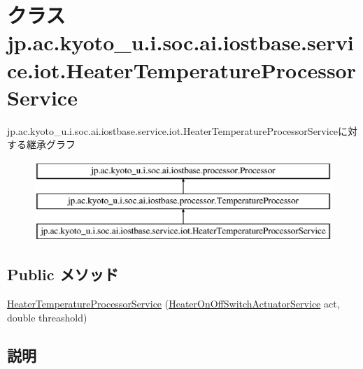 \hypertarget{classjp_1_1ac_1_1kyoto__u_1_1i_1_1soc_1_1ai_1_1iostbase_1_1service_1_1iot_1_1_heater_temperature_processor_service}{\section{クラス jp.\-ac.\-kyoto\-\_\-u.\-i.\-soc.\-ai.\-iostbase.\-service.\-iot.\-Heater\-Temperature\-Processor\-Service}
\label{classjp_1_1ac_1_1kyoto__u_1_1i_1_1soc_1_1ai_1_1iostbase_1_1service_1_1iot_1_1_heater_temperature_processor_service}
}
jp.\-ac.\-kyoto\-\_\-u.\-i.\-soc.\-ai.\-iostbase.\-service.\-iot.\-Heater\-Temperature\-Processor\-Serviceに対する継承グラフ\begin{figure}[H]
\begin{center}
\leavevmode
\includegraphics[height=3.000000cm]{classjp_1_1ac_1_1kyoto__u_1_1i_1_1soc_1_1ai_1_1iostbase_1_1service_1_1iot_1_1_heater_temperature_processor_service}
\end{center}
\end{figure}
\subsection*{Public メソッド}
\begin{DoxyCompactItemize}
\item 
\hyperlink{classjp_1_1ac_1_1kyoto__u_1_1i_1_1soc_1_1ai_1_1iostbase_1_1service_1_1iot_1_1_heater_temperature_processor_service_aa54f6203ff10390b5e4e012012e5cfb3}{Heater\-Temperature\-Processor\-Service} (\hyperlink{classjp_1_1ac_1_1kyoto__u_1_1i_1_1soc_1_1ai_1_1iostbase_1_1service_1_1iot_1_1_heater_on_off_switch_actuator_service}{Heater\-On\-Off\-Switch\-Actuator\-Service} act, double threashold)
\end{DoxyCompactItemize}


\subsection{説明}


